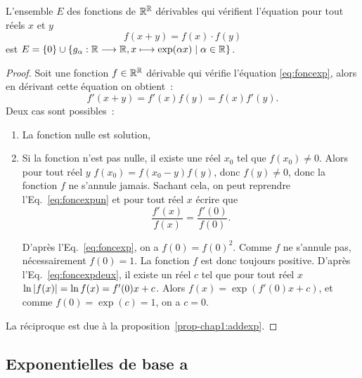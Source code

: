 \begin{theo}
  L'ensemble \(E\) des fonctions de \(\mathbb{R}^{\mathbb{R}}\) dérivables qui vérifient 
  l'équation pour tout réels \(x\) et \(y\)
  \begin{equation}
    \label{eq:foncexp}
    f(x+y) = f(x) \cdot f(y)
  \end{equation}
  est \(E = \left\{0\right\} \cup 
  \left\{g_{\alpha}:\mathbb{R} \longrightarrow \mathbb{R}, x \longmapsto \exp(\alpha x)\mathrel{}\middle|\mathrel{}\alpha \in \mathbb{R}\right\}\).
\end{theo}

\begin{proof}
  Soit une fonction \(f \in \mathbb{R}^{\mathbb{R}}\) dérivable qui vérifie l'équation 
  \eqref{eq:foncexp}, alors en dérivant cette équation on obtient~:
  \begin{equation}
    \label{eq:foncexpun}
    f'(x+y) = f'(x)f(y) = f(x)f'(y).
  \end{equation}
  Deux cas sont possibles~:
  \begin{enumerate}
    \item La fonction nulle est solution,
    \item Si la fonction n'est pas nulle, il existe une réel \(x_0\) tel que 
      \(f(x_0) \neq 0\). Alors pour tout réel \(y\) \(f(x_0)= f(x_0-y)f(y)\), 
      donc \(f(y) \neq 0\), donc la fonction \(f\) ne s'annule jamais. Sachant 
      cela, on peut reprendre l'Eq.~\eqref{eq:foncexpun} et pour tout réel \(x\) 
      écrire que           \begin{equation}
        \label{eq:foncexpdeux}
        \frac{f'(x)}{f(x)} = \frac{f'(0)}{f(0)}.
      \end{equation}

      D'après l'Eq.~\eqref{eq:foncexp}, on a \(f(0) = f(0)^2\).
      Comme \(f\) ne s'annule pas, nécessairement \(f(0) = 1\). La fonction 
      \(f\) est donc toujours positive. D'après l'Eq.~\eqref{eq:foncexpdeux}, il 
      existe un réel \(c\) tel que pour tout réel \(x\) \(\ln \left\lvert f(x)\right\rvert = \ln 
      f(x) = f'(0) x + c\). Alors \(f(x) = \exp(f'(0) x +c)\), et comme \(f(0) = 
      \exp(c) = 1\), on a \(c = 0\).
  \end{enumerate}

  La réciproque est due à la proposition~\ref{prop-chap1:addexp}.
\end{proof}

\subsection{Exponentielles de base a}
\label{subsec:chap1-expa}

